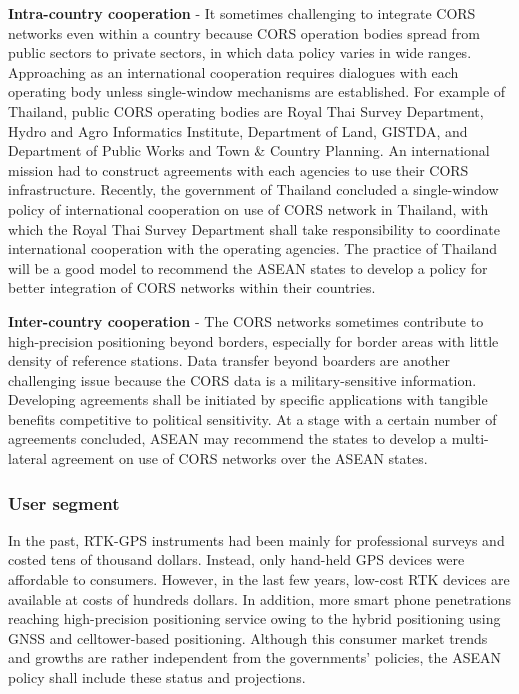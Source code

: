 \textbf{Intra-country cooperation} - It sometimes challenging to integrate CORS networks even within a country because CORS operation bodies spread from public sectors to private sectors, in which data policy varies in wide ranges. Approaching as an international cooperation requires dialogues with each operating body unless single-window mechanisms are established. For example of Thailand, public CORS operating bodies are Royal Thai Survey Department, 
Hydro and Agro Informatics Institute, Department of Land, GISTDA, and Department of Public Works and Town & Country Planning. An international mission had to construct agreements with each agencies to use their CORS infrastructure. Recently, the government of Thailand concluded a single-window policy of international cooperation on use of CORS network in Thailand, with which the Royal Thai Survey Department shall take responsibility to coordinate international cooperation with the operating agencies. The practice of Thailand will be a good model to recommend the ASEAN states to develop a policy for better integration of CORS networks within their countries.

\textbf{Inter-country cooperation} - The CORS networks sometimes contribute to high-precision positioning beyond borders, especially for border areas with little density of reference stations. Data transfer beyond boarders are another challenging issue because the CORS data is a military-sensitive information. Developing agreements shall be initiated by specific applications with tangible benefits competitive to political sensitivity. At a stage with a certain number of agreements concluded, ASEAN may recommend the states to develop a multi-lateral agreement on use of CORS networks over the ASEAN states.

\subsubsection*{User segment}

In the past, RTK-GPS instruments had been mainly for professional surveys and costed tens of thousand dollars. Instead, only hand-held GPS devices were affordable to consumers. However, in the last few years, low-cost RTK devices are available at costs of hundreds dollars. In addition, more smart phone penetrations reaching high-precision positioning service owing to the hybrid positioning using GNSS and celltower-based positioning. Although this consumer market trends and growths are rather independent from the governments' policies, the ASEAN policy shall include these status and projections.

